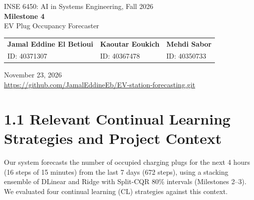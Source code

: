 \documentclass[11pt,letterpaper]{article}
\begin{document}
\begin{center}
{\large INSE 6450: AI in Systems Engineering, Fall 2026}\\[4pt]
{\LARGE\bfseries Milestone 4}\\[3pt]
{\large EV Plug Occupancy Forecaster}\\[8pt]
\begin{tabularx}{\textwidth}{@{}XXX@{}}
\textbf{Jamal Eddine El Betioui} &
\textbf{Kaoutar Eoukich} &
\textbf{Mehdi Sabor} \\[6pt]
ID: 40371307 & ID: 40367478 & ID: 40350733
\end{tabularx}
\small November 23, 2026\\[3pt]
\url{https://github.com/JamalEddineEb/EV-station-forecasting.git}
\end{center}

\section*{1.1 Relevant Continual Learning Strategies and Project Context}

Our system forecasts the number of occupied charging plugs for the next 4 hours (16 steps of 15 minutes) from the
last 7 days (672 steps), using a stacking ensemble of DLinear and Ridge with Split-CQR 80\% intervals
(Milestones 2--3). We evaluated four continual learning (CL) strategies against this context.
\end{document}
